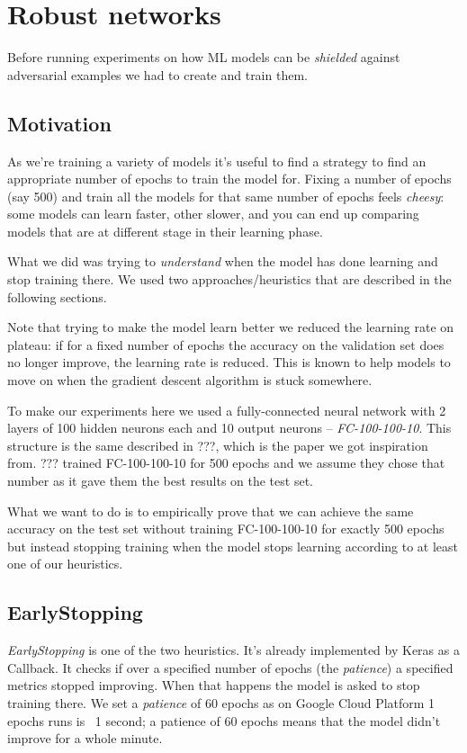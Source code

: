 \chapter{Robust networks}
\label{ch:robust-networks}

Before running experiments on how ML models can be \emph{shielded}
against adversarial examples we had to create and train them.

\section{Motivation}
\label{sec:motivation}
As we're training a variety of models it's useful to find a strategy to
find an appropriate number of epochs to train the model for. Fixing a
number of epochs (say 500) and train all the models for that same
number of epochs feels \emph{cheesy}: some models can learn faster,
other slower, and you can end up comparing models that are at different
stage in their learning phase.

What we did was trying to \emph{understand} when the model has done
learning and stop training there. We used two approaches/heuristics
that are described in the following sections.

Note that trying to make the model learn better we reduced the learning
rate on plateau: if for a fixed number of epochs the accuracy on the
validation set does no longer improve, the learning rate is reduced.
This is known to help models to move on when the gradient descent
algorithm is stuck somewhere.

To make our experiments here we used a fully-connected neural network
with 2 layers of 100 hidden neurons each and 10 output neurons --
\emph{FC-100-100-10}. This structure is the same described in ???,
which is the paper we got inspiration from. ??? trained FC-100-100-10
for 500 epochs and we assume they chose that number as it gave them the
best results on the test set.

What we want to do is to empirically prove that we can achieve the
same accuracy on the test set without training FC-100-100-10 for
exactly 500 epochs but instead stopping training when the model stops
learning according to at least one of our heuristics.

\section{EarlyStopping}
\emph{EarlyStopping} is one of the two heuristics. It's already
implemented by Keras as a Callback. It checks if over a specified
number of epochs (the \emph{patience}) a specified metrics stopped
improving. When that happens the model is asked to stop training there.
We set a \emph{patience} of 60 epochs as on Google Cloud Platform 1
epochs runs is ~1 second; a patience of 60 epochs means that the model
didn't improve for a whole minute.

